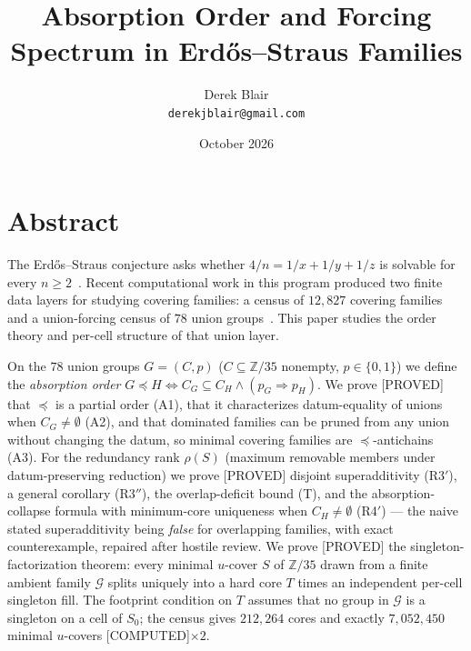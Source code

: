 \documentclass[11pt,a4paper]{article}
\title{Absorption Order and Forcing Spectrum in
  Erd\H{o}s--Straus Families}
\author{Derek Blair \\ \texttt{derekjblair@gmail.com}}
\date{October 2026}
\theoremstyle{definition}
\begin{document}
\maketitle

\section{Abstract}

The Erd\H{o}s--Straus conjecture asks whether $4/n=1/x+1/y+1/z$ is solvable
for every $n\ge2$~\cite{Erd50}.  Recent computational work in this program
produced two finite data layers for studying covering families: a census of $12{,}827$
covering families~\cite{D322} and a union-forcing census of $78$ union
groups~\cite{D322}.  This paper studies the order theory and per-cell
structure of that union layer.

On the $78$ union groups $G=(C,p)$ ($C\subseteq\mathbb{Z}/35$ nonempty, $p\in\{0,1\}$)
we define the \emph{absorption order}
$G\preceq H\iff C_G\subseteq C_H\land(p_G\Rightarrow p_H)$.
We prove [PROVED] that $\preceq$ is a partial order (A1), that it
characterizes datum-equality of unions when $C_G\ne\emptyset$ (A2), and that
dominated families can be pruned from any union without changing the datum,
so minimal covering families are $\preceq$-antichains (A3).  For the redundancy rank
$\rho(S)$ (maximum removable members under datum-preserving reduction) we
prove [PROVED] disjoint superadditivity (R3$'$), a general corollary (R3$''$),
the overlap-deficit bound (T), and the absorption-collapse formula with
minimum-core uniqueness when $C_H\ne\emptyset$ (R4$'$) --- the naive stated
superadditivity being \emph{false} for overlapping families, with exact counterexample, repaired
after hostile review.  We prove [PROVED] the singleton-factorization theorem:
every minimal $u$-cover $S$ of $\mathbb{Z}/35$ drawn from a finite ambient
family $\mathcal G$ splits uniquely into a hard core $T$ times an independent
per-cell singleton fill. The footprint condition on $T$ assumes that no
group in $\mathcal G$ is a singleton on a cell of $S_0$; the census gives
$212{,}264$ cores and exactly $7{,}052{,}450$ minimal $u$-covers
[COMPUTED]$\times2$.
\end{document}

